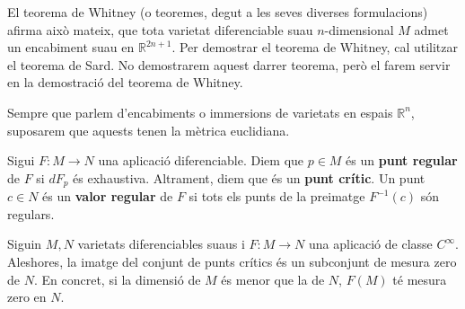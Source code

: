 El teorema de Whitney (o teoremes, degut a les seves diverses formulacions) afirma això mateix, que tota varietat diferenciable suau $n$-dimensional $M$ admet un encabiment suau en $\mathbb R^{2n+1}$. Per demostrar el teorema de Whitney, cal utilitzar el teorema de Sard. No demostrarem aquest darrer teorema, però el farem servir en la demostració del teorema de Whitney.
\begin{nota}
    Sempre que parlem d'encabiments o immersions de varietats en espais $\mathbb R^n$, suposarem que aquests tenen la mètrica euclidiana.
\end{nota}
\begin{defi}
    Sigui $F:M\to N$ una aplicació diferenciable. Diem que $p\in M$ és un \textbf{punt regular} de $F$ si $dF_p$ és exhaustiva. Altrament, diem que és un \textbf{punt crític}. Un punt $c\in N$ és un \textbf{valor regular} de $F$ si tots els punts de la preimatge $F^{-1}(c)$ són regulars.
\end{defi}

\begin{teo}
    Siguin $M, N$ varietats diferenciables suaus i $F:M\to N$ una aplicació de classe $C^\infty$. Aleshores, la imatge del conjunt de punts crítics és un subconjunt de mesura zero de $N$. En concret, si la dimensió de $M$ és menor que la de $N$, $F(M)$ té mesura zero en $N$.
\end{teo}

